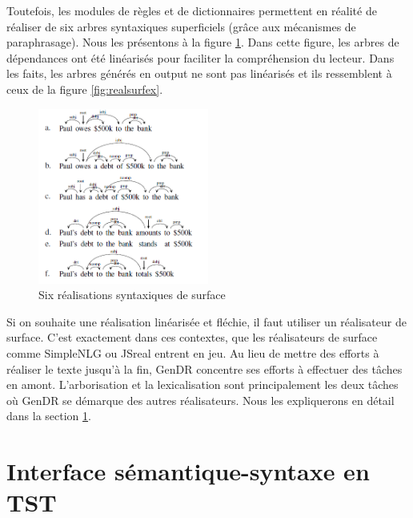 Toutefois, les modules de règles et de dictionnaires permettent en réalité de réaliser de six arbres syntaxiques superficiels (grâce aux mécanismes de paraphrasage). Nous les présentons à la figure \ref{fig:6realsurf}. Dans cette figure, les arbres de dépendances ont été linéarisés pour faciliter la compréhension du lecteur. Dans les faits, les arbres générés en output ne sont pas linéarisés et ils ressemblent à ceux de la figure \ref{fig:realsurfex}.

\begin{figure}[htb]
	\centering
	\includegraphics[width=0.5\textwidth, trim = {0cm 0cm 0cm 0cm},clip]{ch3/figs/exemples_real.png}
	\caption{Six réalisations syntaxiques de surface \citep{lareau18}}
	\label{fig:6realsurf}
\end{figure}

Si on souhaite une réalisation linéarisée et fléchie,  il faut utiliser un réalisateur de surface. C'est exactement dans ces contextes, que les réalisateurs de surface comme SimpleNLG ou JSreal \cite{DaoustJSREALTextRealizer2015}\cite{MolinsJSrealBBilingualText2015}\cite{GattSimpleNLGRealisationEngine2009} entrent en jeu. Au lieu de mettre des efforts à réaliser le texte jusqu'à la fin, GenDR concentre ses efforts à effectuer des tâches en amont. L'arborisation et la lexicalisation sont principalement les deux tâches où GenDR se démarque des autres réalisateurs. Nous les expliquerons en détail dans la section \ref{secsemsynt}.


\section{Interface sémantique-syntaxe en TST}\label{secsemsynt}

